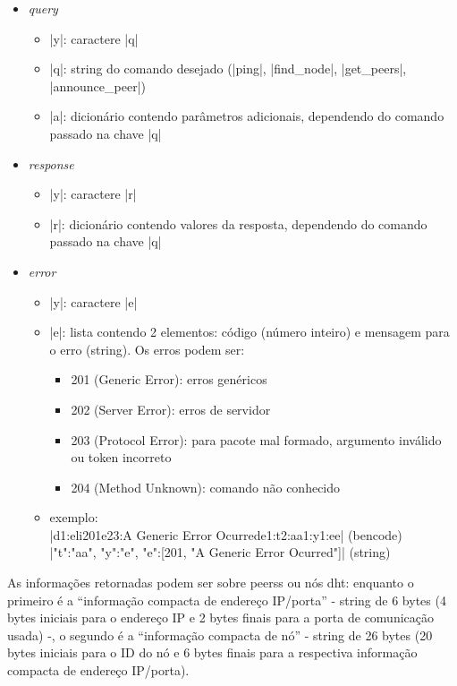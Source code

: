 \newpage
\begin{itemize}
    \item \emph{query}
        \begin{itemize}
            \item \bverb|y|: caractere \sverb|q|
            \item \bverb|q|: string do comando desejado (\sverb|ping|,
                \sverb|find_node|, \sverb|get_peers|, \sverb|announce_peer|)
            \item \bverb|a|: dicionário contendo parâmetros adicionais, dependendo do
                comando passado na chave \bverb|q|
        \end{itemize}

    \item \emph{response}
        \begin{itemize}
            \item \bverb|y|: caractere \sverb|r|
            \item \bverb|r|: dicionário contendo valores da resposta, dependendo do
                comando passado na chave \bverb|q|
        \end{itemize}

    \item \emph{error}
        \begin{itemize}
            \item \bverb|y|: caractere \sverb|e|

            \item \bverb|e|: lista contendo 2 elementos: código (número inteiro) e
                mensagem para o erro (\gls*{string}). Os erros podem ser:
                \begin{itemize}
                    \item 201 (Generic Error): erros genéricos
                    \item 202 (Server Error): erros de servidor
                    \item 203 (Protocol Error): para pacote mal formado, argumento
                        inválido ou token incorreto
                    \item 204 (Method Unknown): comando não conhecido
                \end{itemize}

            \item exemplo: \\
                \bverb|d1:eli201e23:A Generic Error Ocurrede1:t2:aa1:y1:ee|
                (\gls*{bencode}) \\
                \sverb|{"t":"aa", "y":"e", "e":[201, "A Generic Error Ocurred"]}|
                (\gls*{string})
        \end{itemize}
\end{itemize}

As informações retornadas podem ser sobre \glspl*{peers} ou nós \gls{dht}: enquanto o
primeiro é a \enquote{informação compacta de endereço IP/porta} - string de 6 bytes (4
bytes iniciais para o endereço IP e 2 bytes finais para a porta de comunicação usada)
-, o segundo é a \enquote{informação compacta de nó} - string de 26 bytes (20 bytes
iniciais para o ID do nó e 6 bytes finais para a respectiva informação compacta de
endereço IP/porta).